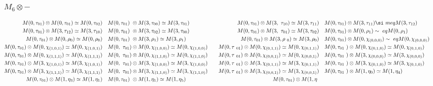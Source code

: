 \subsubsection{$M_6\otimes -$}
\begin{align*}
M(0,\tau_{01}) \otimes M(0,\tau_{01}) \simeq M(0,\tau_{02}) &&& M(0,\tau_{01})\
 \otimes M(3,\tau_{00}) \simeq M(3,\tau_{01}) &&& M(0,\tau_{01}) \otimes M(3,\
\tau_{10}) \simeq M(3,\tau_{11}) &&& M(0,\tau_{01}) \otimes M(3,\tau_{11}) \si\
meq M(3,\tau_{12})\\
M(0,\tau_{01}) \otimes M(3,\tau_{12}) \simeq M(3,\tau_{10}) &&& M(0,\tau_{01})\
 \otimes M(3,\tau_{02}) \simeq M(3,\tau_{00}) &&& M(0,\tau_{01}) \otimes M(3,\
\tau_{01}) \simeq M(3,\tau_{02}) &&& M(0,\tau_{01}) \otimes M(0,\rho_{1}) \sim\
eq M(0,\rho_{1})\\
M(0,\tau_{01}) \otimes M(0,\rho_{0}) \simeq M(0,\rho_{0}) &&& M(0,\tau_{01}) \
\otimes M(3,\rho_{1}) \simeq M(3,\rho_{1}) &&& M(0,\tau_{01}) \otimes M(3,\rho\
_{0}) \simeq M(3,\rho_{0}) &&& M(0,\tau_{01}) \otimes M(0,\chi_{(0,0,0)}) \sim\
eq M(0,\chi_{(0,0,0)})\\
M(0,\tau_{01}) \otimes M(0,\chi_{(1,0,1)}) \simeq M(0,\chi_{(1,0,1)}) &&& M(0,\
\tau_{01}) \otimes M(0,\chi_{(1,0,0)}) \simeq M(0,\chi_{(1,0,0)}) &&& M(0,\tau\
_{01}) \otimes M(0,\chi_{(0,1,1)}) \simeq M(0,\chi_{(0,1,1)}) &&& M(0,\tau_{01\
}) \otimes M(0,\chi_{(0,1,0)}) \simeq M(0,\chi_{(0,1,0)})\\
M(0,\tau_{01}) \otimes M(0,\chi_{(1,1,1)}) \simeq M(0,\chi_{(1,1,1)}) &&& M(0,\
\tau_{01}) \otimes M(0,\chi_{(1,1,0)}) \simeq M(0,\chi_{(1,1,0)}) &&& M(0,\tau\
_{01}) \otimes M(0,\chi_{(0,0,1)}) \simeq M(0,\chi_{(0,0,1)}) &&& M(0,\tau_{01\
}) \otimes M(3,\chi_{(0,0,0)}) \simeq M(3,\chi_{(0,0,0)})\\
M(0,\tau_{01}) \otimes M(3,\chi_{(1,0,1)}) \simeq M(3,\chi_{(1,0,1)}) &&& M(0,\
\tau_{01}) \otimes M(3,\chi_{(1,0,0)}) \simeq M(3,\chi_{(1,0,0)}) &&& M(0,\tau\
_{01}) \otimes M(3,\chi_{(0,1,1)}) \simeq M(3,\chi_{(0,1,1)}) &&& M(0,\tau_{01\
}) \otimes M(3,\chi_{(0,1,0)}) \simeq M(3,\chi_{(0,1,0)})\\
M(0,\tau_{01}) \otimes M(3,\chi_{(1,1,1)}) \simeq M(3,\chi_{(1,1,1)}) &&& M(0,\
\tau_{01}) \otimes M(3,\chi_{(1,1,0)}) \simeq M(3,\chi_{(1,1,0)}) &&& M(0,\tau\
_{01}) \otimes M(3,\chi_{(0,0,1)}) \simeq M(3,\chi_{(0,0,1)}) &&& M(0,\tau_{01\
}) \otimes M(1,\eta_{0}) \simeq M(1,\eta_{4})\\
M(0,\tau_{01}) \otimes M(1,\eta_{3}) \simeq M(1,\eta_{1}) &&& M(0,\tau_{01}) \
\otimes M(1,\eta_{1}) \simeq M(1,\eta_{5}) &&& M(0,\tau_{01}) \otimes M(1,\eta\

\end{align*}

